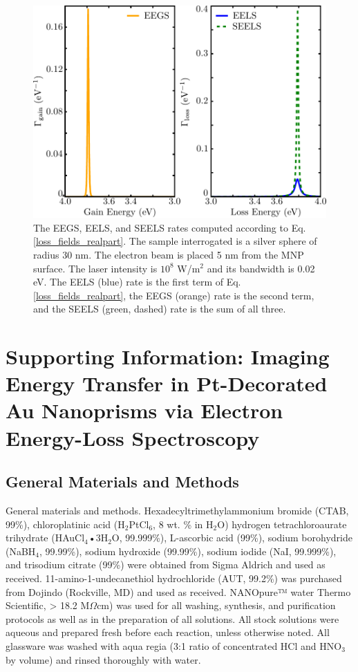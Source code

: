 \documentclass [11pt, proquest] {uwthesis}[2016/11/22]
\begin{document}
\begin{figure}
\begin{centering}
\includegraphics{seels_jpcc.pdf}
\caption{The EEGS, EELS, and SEELS rates computed according to Eq. \ref{loss_fields_realpart}. The sample interrogated is a silver sphere of radius 30 nm. The electron beam is placed 5 nm from the MNP surface. The laser intensity is $10^8$ W/m$^2$ and its bandwidth is 0.02 eV. The EELS (blue) rate is the first term of Eq. \ref{loss_fields_realpart}, the EEGS (orange) rate is the second term, and the SEELS (green, dashed) rate is the sum of all three.}
\label{seels_jpcc}
\end{centering}
\end{figure}


%
\appendix
\raggedbottom\sloppy
 
\chapter{Supporting Information: Imaging Energy Transfer in Pt-Decorated Au Nanoprisms via Electron Energy-Loss Spectroscopy}

\section{General Materials and Methods}

General materials and methods. Hexadecyltrimethylammonium bromide (CTAB, 99\%), chloroplatinic acid (H$_2$PtCl$_6$, 8 wt. \% in H$_2$O) hydrogen tetrachloroaurate trihydrate (HAuCl$_4$•3H$_2$O, 99.999\%), L-ascorbic acid (99\%), sodium borohydride (NaBH$_4$, 99.99\%), sodium hydroxide (99.99\%), sodium iodide (NaI, 99.999\%), and trisodium citrate (99\%) were obtained from Sigma Aldrich and used as received. 11-amino-1-undecanethiol hydrochloride (AUT, 99.2\%) was purchased from Dojindo (Rockville, MD) and used as received. NANOpure™ water Thermo Scientific, > 18.2 M$\Omega$cm) was used for all washing, synthesis, and purification protocols as well as in the preparation of all solutions. All stock solutions were aqueous and prepared fresh before each reaction, unless otherwise noted. All glassware was washed with aqua regia (3:1 ratio of concentrated HCl and HNO$_3$ by volume) and rinsed thoroughly with water.
\end{document}

